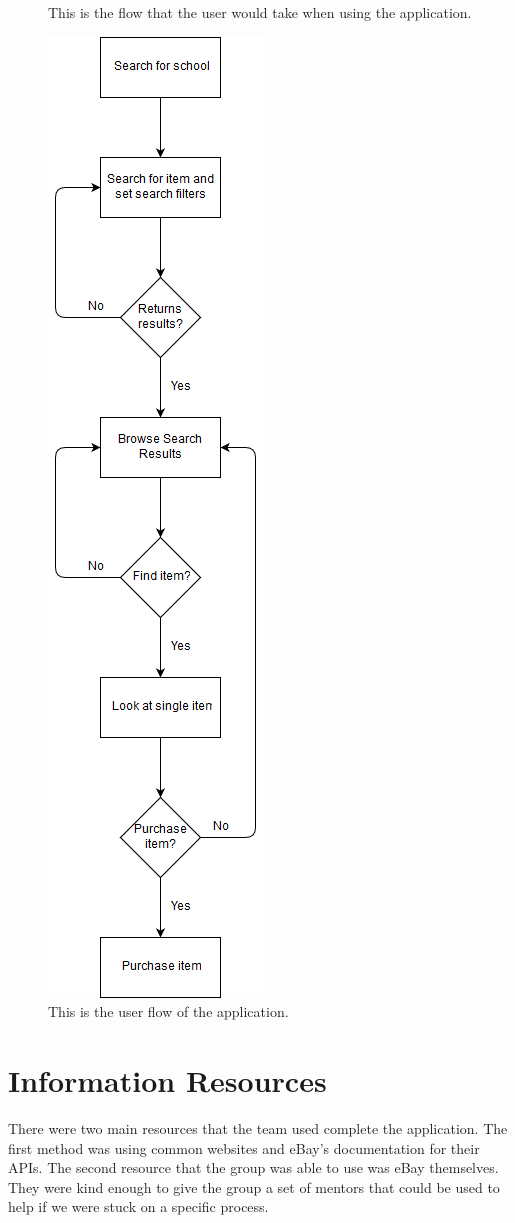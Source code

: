 \documentclass[journal,compsoc, 10pt, draftclsnofoot, onecolumn]{IEEEtran}
\begin{document}
\begin{figure}[!h]
This is the flow that the user would take when using the application.
\centering
\caption{This is the user flow of the application.}
\includegraphics[scale=.67]{flowOfApp}
\end{figure}
\FloatBarrier

\section{Information Resources}
There were two main resources that the team used complete the application. The first method was
using common websites and eBay's documentation for their APIs. The second resource that the
group was able to use was eBay themselves. They were kind enough to give the group a set of
mentors that could be used to help if we were stuck on a specific process.
\end{document}
